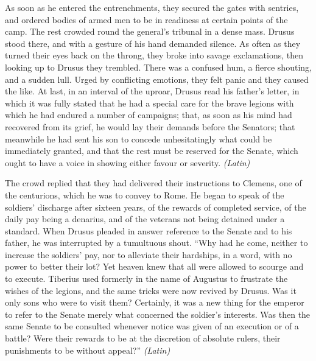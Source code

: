 
As soon as he entered the entrenchments, they secured the gates with sentries, and ordered bodies of armed men to be in readiness at certain points of the camp. The rest crowded round the general's tribunal in a dense mass. Drusus stood there, and with a gesture of his hand demanded silence. As often as they turned their eyes back on the throng, they broke into savage exclamations, then looking up to Drusus they trembled. There was a confused hum, a fierce shouting, and a sudden lull. Urged by conflicting emotions, they felt panic and they caused the like. At last, in an interval of the uproar, Drusus read his father's letter, in which it was fully stated that he had a special care for the brave legions with which he had endured a number of campaigns; that, as soon as his mind had recovered from its grief, he would lay their demands before the Senators; that meanwhile he had sent his son to concede unhesitatingly what could be immediately granted, and that the rest must be reserved for the Senate, which ought to have a voice in showing either favour or severity. \emph{(Latin)}


The crowd replied that they had delivered their instructions to Clemens, one of the centurions, which he was to convey to Rome. He began to speak of the soldiers' discharge after sixteen years, of the rewards of completed service, of the daily pay being a denarius, and of the veterans not being detained under a standard. When Drusus pleaded in answer reference to the Senate and to his father, he was interrupted by a tumultuous shout. ``Why had he come, neither to increase the soldiers' pay, nor to alleviate their hardships, in a word, with no power to better their lot? Yet heaven knew that all were allowed to scourge and to execute. Tiberius used formerly in the name of Augustus to frustrate the wishes of the legions, and the same tricks were now revived by Drusus. Was it only sons who were to visit them? Certainly, it was a new thing for the emperor to refer to the Senate merely what concerned the soldier's interests. Was then the same Senate to be consulted whenever notice was given of an execution or of a battle? Were their rewards to be at the discretion of absolute rulers, their punishments to be without appeal?'' \emph{(Latin)}


